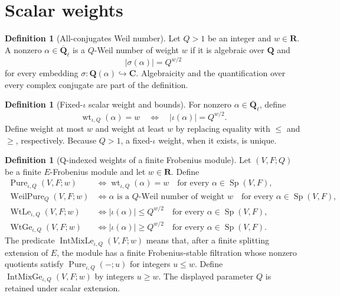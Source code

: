 \documentclass[10pt]{article}
\theoremstyle{definition}
\newtheorem{definition}[theorem]{Definition}
\newcommand{\Qlb}{\overline{\mathbf Q}_\ell}
\begin{document}
\section{Scalar weights}

\begin{definition}[All-conjugates Weil number]
Let \(Q>1\) be an integer and \(w\in\mathbf R\).  A nonzero
\(\alpha\in\Qlb\) is a \(Q\)-Weil number of weight \(w\) if it is
algebraic over \(\mathbf Q\) and
\[
                  |\sigma(\alpha)|=Q^{w/2}
\]
for every embedding
\(\sigma:\mathbf Q(\alpha)\hookrightarrow\mathbf C\).  Algebraicity and
the quantification over every complex conjugate are part of the definition.
\end{definition}

\begin{definition}[Fixed-\(\iota\) scalar weight and bounds]
For nonzero \(\alpha\in\Qlb\), define
\[
 \operatorname{wt}_{\iota,Q}(\alpha)=w
 \quad\Longleftrightarrow\quad
 |\iota(\alpha)|=Q^{w/2}.
\]
Define weight at most \(w\) and weight at least \(w\) by replacing equality
with \(\le\) and \(\ge\), respectively.  Because \(Q>1\), a fixed-\(\iota\)
weight, when it exists, is unique.
\end{definition}

\begin{definition}[Q-indexed weights of a finite Frobenius module]
Let \((V,F;Q)\) be a finite \(E\)-Frobenius module and let
\(w\in\mathbf R\).  Define
\[
\begin{aligned}
 \operatorname{Pure}_{\iota,Q}(V,F;w)
 &\Longleftrightarrow
   \operatorname{wt}_{\iota,Q}(\alpha)=w
   \quad\text{for every }\alpha\in\operatorname{Sp}(V,F),\\
 \operatorname{WeilPure}_{Q}(V,F;w)
 &\Longleftrightarrow
   \alpha\text{ is a \(Q\)-Weil number of weight \(w\)}
   \quad\text{for every }\alpha\in\operatorname{Sp}(V,F),\\
 \operatorname{WtLe}_{\iota,Q}(V,F;w)
 &\Longleftrightarrow
   |\iota(\alpha)|\le Q^{w/2}
   \quad\text{for every }\alpha\in\operatorname{Sp}(V,F),\\
 \operatorname{WtGe}_{\iota,Q}(V,F;w)
 &\Longleftrightarrow
   |\iota(\alpha)|\ge Q^{w/2}
   \quad\text{for every }\alpha\in\operatorname{Sp}(V,F).
\end{aligned}
\]
The predicate \(\operatorname{IntMixLe}_{\iota,Q}(V,F;w)\) means that,
after a finite splitting extension of \(E\), the module has a finite
Frobenius-stable filtration whose nonzero quotients satisfy
\(\operatorname{Pure}_{\iota,Q}(-;u)\) for integers \(u\le w\).  Define
\(\operatorname{IntMixGe}_{\iota,Q}(V,F;w)\) by integers \(u\ge w\).
The displayed parameter \(Q\) is retained under scalar extension.
\end{definition}
\end{document}
